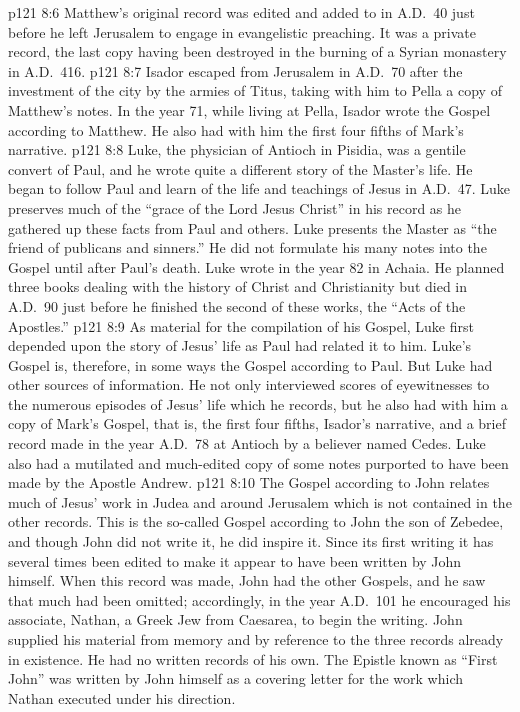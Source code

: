 \vs p121 8:6 Matthew’s original record was edited and added to in A.D.~40 just before he left Jerusalem to engage in evangelistic preaching. It was a private record, the last copy having been destroyed in the burning of a Syrian monastery in A.D.~416.
\vs p121 8:7 Isador escaped from Jerusalem in A.D.~70 after the investment of the city by the armies of Titus, taking with him to Pella a copy of Matthew’s notes. In the year 71, while living at Pella, Isador wrote the Gospel according to Matthew. He also had with him the first four fifths of Mark’s narrative.
\pc \vs p121 8:8 \bibnobreakspace {} Luke, the physician of Antioch in Pisidia, was a gentile convert of Paul, and he wrote quite a different story of the Master’s life. He began to follow Paul and learn of the life and teachings of Jesus in A.D.~47. Luke preserves much of the “grace of the Lord Jesus Christ” in his record as he gathered up these facts from Paul and others. Luke presents the Master as “the friend of publicans and sinners.” He did not formulate his many notes into the Gospel until after Paul’s death. Luke wrote in the year 82 in Achaia. He planned three books dealing with the history of Christ and Christianity but died in A.D.~90 just before he finished the second of these works, the “Acts of the Apostles.”
\vs p121 8:9 As material for the compilation of his Gospel, Luke first depended upon the story of Jesus’ life as Paul had related it to him. Luke’s Gospel is, therefore, in some ways the Gospel according to Paul. But Luke had other sources of information. He not only interviewed scores of eyewitnesses to the numerous episodes of Jesus’ life which he records, but he also had with him a copy of Mark’s Gospel, that is, the first four fifths, Isador’s narrative, and a brief record made in the year A.D.~78 at Antioch by a believer named Cedes. Luke also had a mutilated and much\hyp{}edited copy of some notes purported to have been made by the Apostle Andrew.
\pc \vs p121 8:10 \bibnobreakspace {} The Gospel according to John relates much of Jesus’ work in Judea and around Jerusalem which is not contained in the other records. This is the so\hyp{}called Gospel according to John the son of Zebedee, and though John did not write it, he did inspire it. Since its first writing it has several times been edited to make it appear to have been written by John himself. When this record was made, John had the other Gospels, and he saw that much had been omitted; accordingly, in the year A.D.~101 he encouraged his associate, Nathan, a Greek Jew from Caesarea, to begin the writing. John supplied his material from memory and by reference to the three records already in existence. He had no written records of his own. The Epistle known as “First John” was written by John himself as a covering letter for the work which Nathan executed under his direction.
